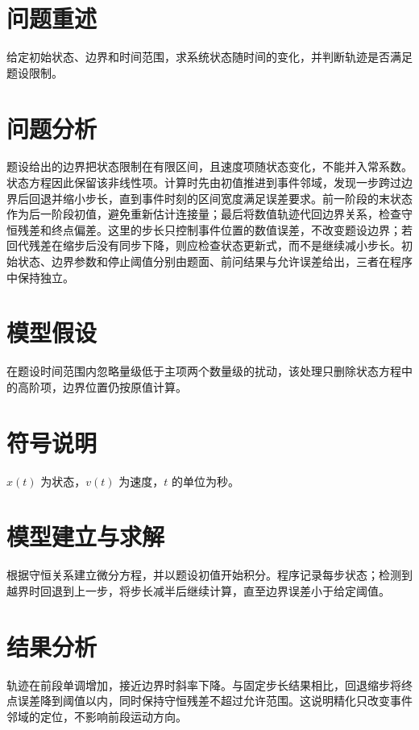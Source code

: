 \documentclass{ctexart}
\newcommand{\keywords}[1]{\par\textbf{关键词：}#1}
\begin{document}
\begin{abstract}
本文研究受边界约束的连续运动。由守恒关系建立状态方程，采用数值求解得到轨迹，并用边界回代误差检查结果。
\keywords{机理模型；数值求解；误差分析}
\end{abstract}

\section{问题重述}
给定初始状态、边界和时间范围，求系统状态随时间的变化，并判断轨迹是否满足题设限制。

\section{问题分析}
题设给出的边界把状态限制在有限区间，且速度项随状态变化，不能并入常系数。状态方程因此保留该非线性项。计算时先由初值推进到事件邻域，发现一步跨过边界后回退并缩小步长，直到事件时刻的区间宽度满足误差要求。前一阶段的末状态作为后一阶段初值，避免重新估计连接量；最后将数值轨迹代回边界关系，检查守恒残差和终点偏差。这里的步长只控制事件位置的数值误差，不改变题设边界；若回代残差在缩步后没有同步下降，则应检查状态更新式，而不是继续减小步长。初始状态、边界参数和停止阈值分别由题面、前问结果与允许误差给出，三者在程序中保持独立。

\section{模型假设}
在题设时间范围内忽略量级低于主项两个数量级的扰动，该处理只删除状态方程中的高阶项，边界位置仍按原值计算。

\section{符号说明}
$x(t)$ 为状态，$v(t)$ 为速度，$t$ 的单位为秒。

\section{模型建立与求解}
根据守恒关系建立微分方程，并以题设初值开始积分。程序记录每步状态；检测到越界时回退到上一步，将步长减半后继续计算，直至边界误差小于给定阈值。

\section{结果分析}
轨迹在前段单调增加，接近边界时斜率下降。与固定步长结果相比，回退缩步将终点误差降到阈值以内，同时保持守恒残差不超过允许范围。这说明精化只改变事件邻域的定位，不影响前段运动方向。
\end{document}
